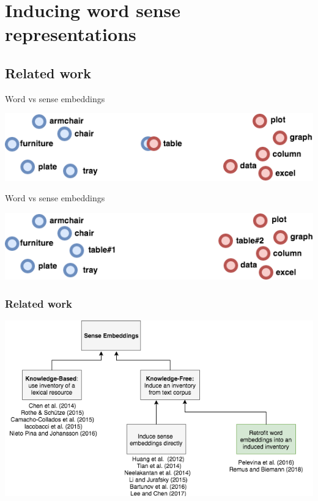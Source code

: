
\section{Inducing word sense representations}


\subsection{Related work}

\begin{frame}{Word vs sense embeddings}

\begin{center}
	\includegraphics[width=1.0\textwidth]{figures/table-ambigous}
\end{center}	
\end{frame}

\begin{frame}{Word vs sense embeddings}

\begin{center}
	\includegraphics[width=1.0\textwidth]{figures/table-unambigous}
\end{center}	
\end{frame}


\begin{frame}[fragile]
\frametitle{Related work}
\begin{center}
 \includegraphics[height=0.56\textwidth]{figures/GWC-1}
 \end{center}
\end{frame}


